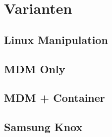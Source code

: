 \chapter{Varianten}


\section{Linux Manipulation}

\section{MDM Only}

\section{MDM + Container}

\section{Samsung Knox}